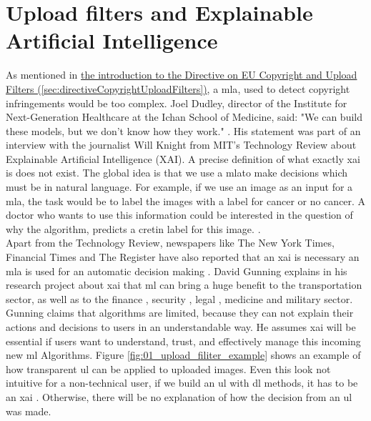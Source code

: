 \section{Upload filters and Explainable Artificial Intelligence}
\label{sec:uploadFiltersXAI}

As mentioned in \hyperref[sec:directiveCopyrightUploadFilters]{the introduction to the Directive on EU Copyright and Upload Filters (\ref{sec:directiveCopyrightUploadFilters})}, a \gls{mla}, used to detect copyright infringements would be too complex. Joel Dudley, director of the Institute for Next-Generation Healthcare at the Ichan School of Medicine, said: "We can build these models, but we don't know how they work." \cite{Knight2019}. His statement was part of an interview with the journalist Will Knight from MIT's Technology Review about Explainable Artificial Intelligence (XAI). A precise definition of what exactly \gls{xai} is does not exist. The global idea is that we use a \gls{mla}to make decisions which must be in natural language. For example, if we use an image as an input for a \gls{mla}, the task would be to label the images with a label for cancer or no cancer. A doctor who wants to use this information could be interested in the question of why the algorithm, predicts a cretin label for this image. \cite{SamekWojciech2017}.\\

Apart from the Technology Review, newspapers like The New York Times, Financial Times and The Register have also reported that an \gls{xai} is necessary an \gls{mla} is used for an automatic decision making \cite{Kuang2017} \cite{Robinson2017} \cite{Waters2017}. David Gunning explains in his research project about \gls{xai} that \gls{ml} can bring a huge benefit to the transportation sector, as well as to the finance , security , legal , medicine and military sector. Gunning claims that algorithms are limited, because they can not explain their actions and decisions to users in an understandable way. He assumes \gls{xai} will be essential if users want to understand, trust, and effectively manage this incoming new \gls{ml} Algorithms\cite{Gunning2019}. Figure \ref{fig:01_upload_filiter_example} shows an example of how transparent \gls{ul} can be applied to uploaded images. Even this look not intuitive for a non-technical user, if we build an \gls{ul} with \gls{dl} methods, it has to be an \gls{xai} \cite{WaltermannHubertus2019}. Otherwise, there will be no explanation of how the decision from an \gls{ul} was made.\\


